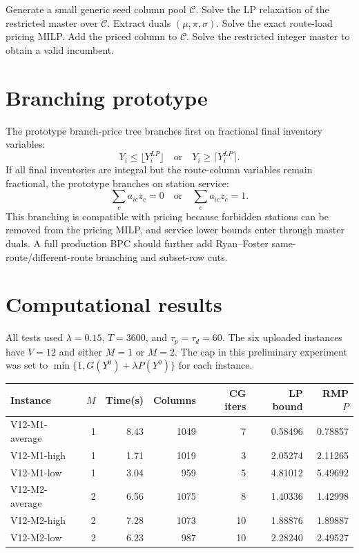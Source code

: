 \documentclass[11pt]{article}
\begin{document}
\begin{algorithm}[h]
\caption{Fixed-cap route-load column generation}
\begin{algorithmic}[1]
\State Generate a small generic seed column pool $\mathcal C$.
\Repeat
    \State Solve the LP relaxation of the restricted master over $\mathcal C$.
    \State Extract duals $(\mu,\pi,\sigma)$.
    \State Solve the exact route-load pricing MILP.
        \State Add the priced column to $\mathcal C$.
    \EndIf
{}
\State Solve the restricted integer master to obtain a valid incumbent.
\end{algorithmic}
\end{algorithm}

\section{Branching prototype}
The prototype branch-price tree branches first on fractional final inventory variables:
\[
 Y_i\le \lfloor Y_i^{LP}\rfloor
 \quad\text{or}\quad
 Y_i\ge \lceil Y_i^{LP}\rceil.
\]
If all final inventories are integral but the route-column variables remain fractional, the prototype branches on station service:
\[
 \sum_c a_{ic}z_c=0
 \quad\text{or}\quad
 \sum_c a_{ic}z_c=1.
\]
This branching is compatible with pricing because forbidden stations can be removed from the pricing MILP, and service lower bounds enter through master duals.  A full production BPC should further add Ryan--Foster same-route/different-route branching and subset-row cuts.

\section{Computational results}
All tests used $\lambda=0.15$, $T=3600$, and $\tau_p=\tau_d=60$.  The six uploaded instances have $V=12$ and either $M=1$ or $M=2$.  The cap in this preliminary experiment was set to $\min\{1,G(Y^0)+\lambda P(Y^0)\}$ for each instance.

\begin{center}
\begin{tabular}{lrrrrrr}
\toprule
Instance & $M$ & Time(s) & Columns & CG iters & LP bound & RMP $P$ \\
\midrule
V12-M1-average & 1 & 8.43 & 1049 & 7 & 0.58496 & 0.78857 \\
V12-M1-high & 1 & 1.71 & 1019 & 3 & 2.05274 & 2.11265 \\
V12-M1-low & 1 & 3.04 & 959 & 5 & 4.81012 & 5.49692 \\
V12-M2-average & 2 & 6.56 & 1075 & 8 & 1.40336 & 1.42998 \\
V12-M2-high & 2 & 7.28 & 1073 & 10 & 1.88876 & 1.89887 \\
V12-M2-low & 2 & 6.23 & 987 & 10 & 2.28240 & 2.49527 \\
\bottomrule
\end{tabular}
\end{center}
\end{document}

